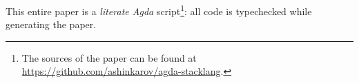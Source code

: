 \documentclass[sigplan,screen]{acmart}
\newcommand{\myref}[2]{\hyperref[#2]{#1~\ref*{#2}}}
\newcommand{\secref}[1]{\myref{Sect.}{sec:#1}}
\begin{document}
This entire paper is a \emph{literate Agda} script\footnote{The sources of the paper
can be found at \url{https://github.com/ashinkarov/agda-stacklang}.}:
all code is typechecked while generating the paper.

\begin{comment}
The rest of this paper is structured as follows. \secref{background}
provides background information on Agda and its reflection
capabilities. \secref{embedding} describes our embedding of PostScript
in Agda, and gives several examples of programs written in
it. \secref{extraction} shows how to implement an extractor for this
embedding using reflection. Next, \secref{partial-evaluation}
demonstrates how to apply partial evaluation to programs prior to
extraction by using Agda's normalisation procedure. Finally,
\secref{related} discusses related work and \secref{conclusion}
concludes.
\end{comment}

\begin{comment}
\todo[inline]{Move it somewhere}
This picture has been generated by the code that was extracted from our
Agda embedding.

\begin{center}
\epsfbox[0 0 64 64]{sierp.ps}
\end{center}
\end{comment}

%
\end{document}
